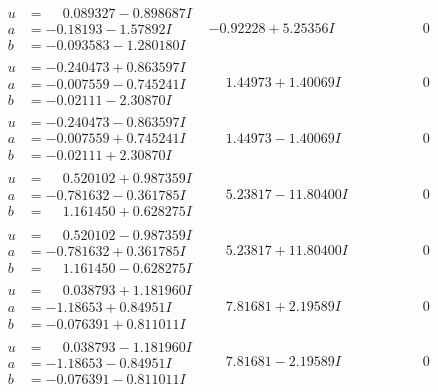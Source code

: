 \documentclass[1p]{elsarticle_modified}
\theoremstyle{definition}
\begin{document}
$$\begin{array}{c|c|c}
\begin{aligned}
u &= \phantom{-}0.089327 - 0.898687 I \\
a &= -0.18193 - 1.57892 I \\
b &= -0.093583 - 1.280180 I\end{aligned}
 & -0.92228 + 5.25356 I & \phantom{-0.000000 } 0 \\ \hline\begin{aligned}
u &= -0.240473 + 0.863597 I \\
a &= -0.007559 - 0.745241 I \\
b &= -0.02111 - 2.30870 I\end{aligned}
 & \phantom{-}1.44973 + 1.40069 I & \phantom{-0.000000 } 0 \\ \hline\begin{aligned}
u &= -0.240473 - 0.863597 I \\
a &= -0.007559 + 0.745241 I \\
b &= -0.02111 + 2.30870 I\end{aligned}
 & \phantom{-}1.44973 - 1.40069 I & \phantom{-0.000000 } 0 \\ \hline\begin{aligned}
u &= \phantom{-}0.520102 + 0.987359 I \\
a &= -0.781632 - 0.361785 I \\
b &= \phantom{-}1.161450 + 0.628275 I\end{aligned}
 & \phantom{-}5.23817 - 11.80400 I & \phantom{-0.000000 } 0 \\ \hline\begin{aligned}
u &= \phantom{-}0.520102 - 0.987359 I \\
a &= -0.781632 + 0.361785 I \\
b &= \phantom{-}1.161450 - 0.628275 I\end{aligned}
 & \phantom{-}5.23817 + 11.80400 I & \phantom{-0.000000 } 0 \\ \hline\begin{aligned}
u &= \phantom{-}0.038793 + 1.181960 I \\
a &= -1.18653 + 0.84951 I \\
b &= -0.076391 + 0.811011 I\end{aligned}
 & \phantom{-}7.81681 + 2.19589 I & \phantom{-0.000000 } 0 \\ \hline\begin{aligned}
u &= \phantom{-}0.038793 - 1.181960 I \\
a &= -1.18653 - 0.84951 I \\
b &= -0.076391 - 0.811011 I\end{aligned}
 & \phantom{-}7.81681 - 2.19589 I & \phantom{-0.000000 } 0 \\ \hline\begin{aligned}

\end{aligned}
\end{array}$$
\end{document}
